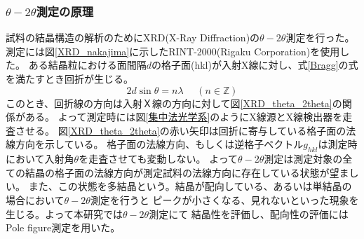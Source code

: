 \documentclass[dvipdfmx,12pt,a4paper]{jreport}
\begin{document}
			\subsubsection{$\theta - 2\theta$測定の原理}
			試料の結晶構造の解析のためにXRD(X-Ray Diffraction)の$\theta-2\theta$測定を行った。
			測定には図\ref{XRD_nakajima}に示したRINT-2000(Rigaku Corporation)を使用した。
			ある結晶粒における面間隔$d$の格子面(hkl)が入射X線に対し、式\ref{Bragg}の式を満たすとき回折が生じる。
			\begin{equation}
				2d \sin \theta = n \lambda \ \ \ \ \ \ (n\in \mathbb{Z})
				\label{Bragg}
			\end{equation}
			このとき、回折線の方向は入射Ｘ線の方向に対して図\ref{XRD_theta_2theta}の関係がある。
			よって測定時には図\ref{集中法光学系}のようにX線源とX線検出器を走査させる。
			図\ref{XRD_theta_2theta}の赤い矢印は回折に寄与している格子面の法線方向を示している。
			格子面の法線方向、もしくは逆格子ベクトル$g_{hkl}$は測定時において入射角$\theta$を走査させても変動しない。
			よって$\theta-2\theta$測定は測定対象の全ての結晶の格子面の法線方向が測定試料の法線方向に存在している状態が望ましい。
			また、この状態を多結晶という。結晶が配向している、あるいは単結晶の場合において$\theta-2\theta$測定を行うと
			ピークが小さくなる、見れないといった現象を生じる。よって本研究では$\theta-2\theta$測定にて
			結晶性を評価し、配向性の評価にはPole figure測定を用いた。
\end{document}
